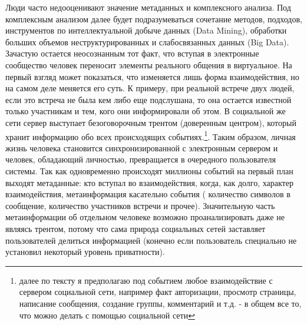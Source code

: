 Люди часто недооценивают значение метаданных и комплексного анализа. 
Под комплексным анализом далее будет подразумеваться сочетание методов, подходов, инструментов по интеллектуальной добыче данных (Data Mining), %
обработки больших объемов неструктурированных и слабосвязанных данных (Big Data).\\
Зачастую остается неосознанным тот факт, что вступая в электронные сообщество человек переносит элементы реального общения в виртуальное. На первый взгляд может показаться, что изменяется лишь форма взаимодействия, но на самом деле меняется его суть.
 К примеру, при реальной встрече двух людей, если это встреча не была кем либо еще подслушана, то она остается известной только участникам и тем, кого они информировали об этом. В социальной же сети сервер выступает безоговорочным трентом (доверенным центром), который хранит информацию обо всех происходящих событиях.\footnote{далее по тексту я предполагаю под событием любое взаимодействие с сервером социальной сети, например факт авторизации, просмотр страницы, написание сообщения, создание группы, комментарий и т.д. - в общем все то, что можно делать с помощью социальной сети}. Таким образом, личная жизнь человека становится синхронизированной с электронным сервером и человек, обладающий личностью, превращается в очередного пользователя системы.
 Так как одновременно происходят миллионы событий на первый план выходят метаданные: кто вступал во взаимодействия, когда, как долго, характер взаимодействия, метаинформация касательно события ( количество символов в сообщение, количество участников встречи и прочее). Значительную часть метаинформации об отдельном человеке возможно проанализировать даже не являясь трентом, потому что сама природа социальных сетей заставляет пользователей делиться информацией (конечно если пользователь специально не установил некоторый уровень приватности).\\

